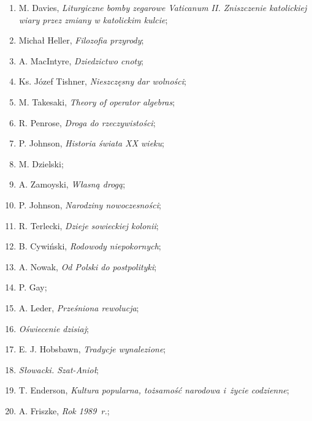 \documentclass[a4paper,11pt]{article}
\begin{document}
\begin{enumerate}
\item M. Davies, \emph{Liturgiczne bomby zegarowe Vaticanum II.
    Zniszczenie katolickiej wiary przez zmiany w katolickim kulcie};

\item Michał Heller, \emph{Filozofia przyrody};

\item A. MacIntyre, \emph{Dziedzictwo cnoty};

\item Ks. Józef Tishner, \emph{Nieszczęsny dar wolności};

\item M. Takesaki, \emph{Theory of operator algebras};

\item R. Penrose, \emph{Droga do rzeczywistości};

\item P. Johnson, \emph{Historia świata XX wieku};

\item M. Dzielski;

\item A. Zamoyski, \emph{Własną drogą};

\item P. Johnson, \emph{Narodziny nowoczesności};

\item R. Terlecki, \emph{Dzieje sowieckiej kolonii};

\item B. Cywiński, \emph{Rodowody niepokornych};

\item A. Nowak, \emph{Od Polski do postpolityki};

\item P. Gay;

\item A. Leder, \emph{Prześniona rewolucja};

\item \emph{Oświecenie dzisiaj};

\item E. J. Hobsbawn, \emph{Tradycje wynalezione};

\item \emph{Słowacki. Szat-Anioł};

\item T. Enderson, \emph{Kultura popularna, tożsamość narodowa i~życie
    codzienne};

\item A. Friszke, \emph{Rok 1989~r.};


\end{enumerate}
\end{document}
